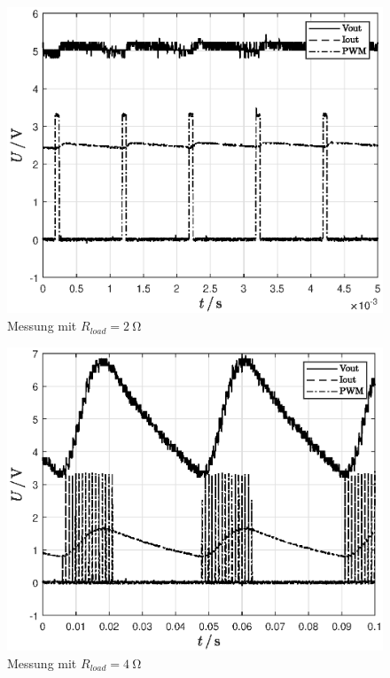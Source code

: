 \begin{figure}[H]
    \centering
    \includegraphics[width=0.8\linewidth]{Figure/Rload2.eps}
    \caption{Messung mit $R_{load} = \SI{2}{\ohm}$}
    \label{fig:Rload2}
\end{figure}

\begin{figure}[H]
    \centering
    \includegraphics[width=0.8\linewidth]{Figure/Rload4.eps}
    \caption{Messung mit $R_{load} = \SI{4}{\ohm}$}
    \label{fig:Rload4}
\end{figure}